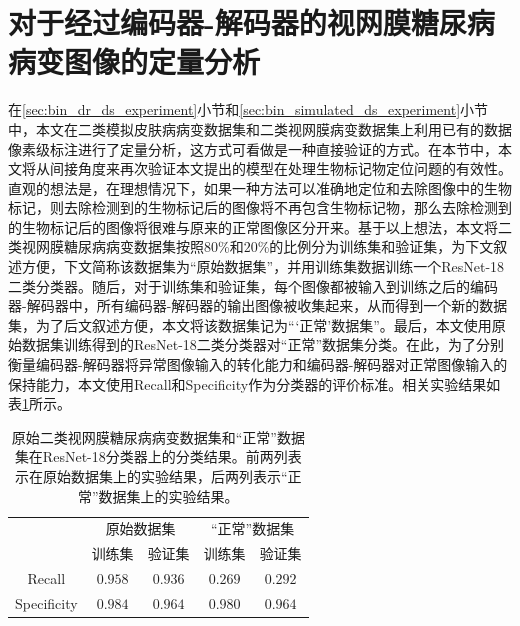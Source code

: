 \section{对于经过编码器-解码器的视网膜糖尿病病变图像的定量分析}\label{sec:indirect_quantitative_evaluation}
在\ref{sec:bin_dr_ds_experiment}小节和\ref{sec:bin_simulated_ds_experiment}小节中，本文在二类模拟皮肤病病变数据集和二类视网膜病变数据集上利用已有的数据像素级标注进行了定量分析，这方式可看做是一种直接验证的方式。在本节中，本文将从间接角度来再次验证本文提出的模型在处理生物标记物定位问题的有效性。直观的想法是，在理想情况下，如果一种方法可以准确地定位和去除图像中的生物标记，则去除检测到的生物标记后的图像将不再包含生物标记物，那么去除检测到的生物标记后的图像将很难与原来的正常图像区分开来。基于以上想法，本文将二类视网膜糖尿病病变数据集按照$80$\%和$20$\%的比例分为训练集和验证集，为下文叙述方便，下文简称该数据集为“原始数据集”，并用训练集数据训练一个ResNet-18二类分类器。随后，对于训练集和验证集，每个图像都被输入到训练之后的编码器-解码器中，所有编码器-解码器的输出图像被收集起来，从而得到一个新的数据集，为了后文叙述方便，本文将该数据集记为“‘正常’数据集”。最后，本文使用原始数据集训练得到的ResNet-18二类分类器对“正常”数据集分类。在此，为了分别衡量编码器-解码器将异常图像输入的转化能力和编码器-解码器对正常图像输入的保持能力，本文使用Recall和Specificity作为分类器的评价标准。相关实验结果如表\ref{tab:quantitative_retinal}所示。

\begin{table}[h!]
	\begin{center}
		\caption{原始二类视网膜糖尿病病变数据集和“正常”数据集在ResNet-18分类器上的分类结果。前两列表示在原始数据集上的实验结果，后两列表示“正常”数据集上的实验结果。} 
		\label{tab:quantitative_retinal}
		\begin{tabular}{c|cc|cc}
			\toprule[2pt]
			& \multicolumn{2}{c|}{原始数据集} & \multicolumn{2}{c}{“正常”数据集} \\
			&  训练集 & 验证集 & 训练集 & 验证集\\
			\midrule[2pt]
			Recall & $0.958$ & $0.936$ & $0.269$ & $0.292$\\ \hline
			Specificity & $0.984$ & $0.964$ & $0.980$ & $0.964$\\
			\bottomrule[2pt]
		\end{tabular} 
	\end{center}
\end{table}

